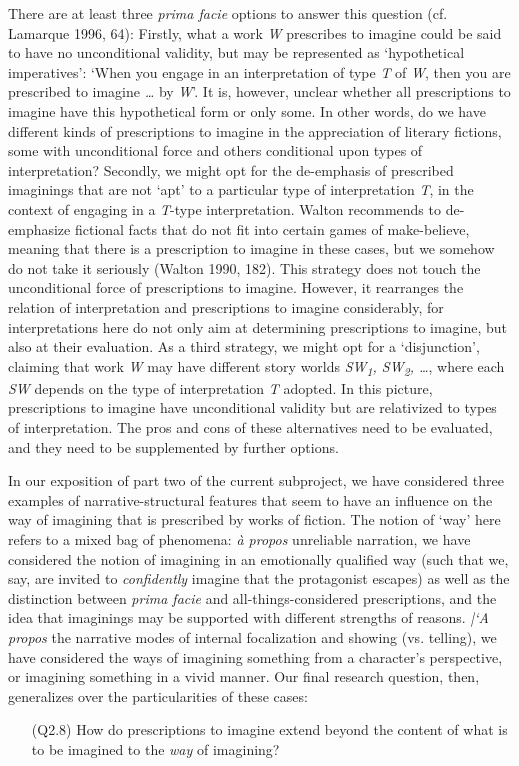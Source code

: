 \noindent There are at least three \emph{prima facie} options to answer this question (cf. Lamarque 1996, 64): Firstly, what a work \emph{W} prescribes to imagine could be said to have no unconditional validity, but may be represented as `hypothetical imperatives': `When you engage in an interpretation of type \emph{T} of \emph{W}, then you are prescribed to imagine \emph{\ldots} by \emph{W}'. It is, however, unclear whether all prescriptions to imagine have this hypothetical form or only some. In other words, do we have different kinds of prescriptions to imagine in the appreciation of literary fictions, some with unconditional force and others conditional upon types of interpretation? Secondly, we might opt for the de-emphasis of prescribed imaginings that are not `apt' to a particular type of interpretation \emph{T}, in the context of engaging in a \emph{T}-type interpretation. Walton recommends to de-emphasize fictional facts that do not fit into certain games of make-believe, meaning that there is a prescription to imagine in these cases, but we somehow do not take it seriously (Walton 1990, 182). This strategy does not touch the unconditional force of prescriptions to imagine. However, it rearranges the relation of interpretation and prescriptions to imagine considerably, for interpretations here do not only aim at determining prescriptions to imagine, but also at their evaluation. As a third strategy, we might opt for a `disjunction', claiming that work \emph{W} may have different story worlds \emph{SW\textsubscript{1}, SW\textsubscript{2}, \ldots}, where each \emph{SW} depends on the type of interpretation \emph{T} adopted. In this picture, prescriptions to imagine have unconditional validity but are relativized to types of interpretation. The pros and cons of these alternatives need to be evaluated, and they need to be supplemented by further options. 

In our exposition of part two of the current subproject, we have considered three examples of narrative-structural features that seem to have an influence on the way of imagining that is prescribed by works of fiction. The notion of `way' here refers to a mixed bag of phenomena: \emph{\`a propos} unreliable narration, we have considered the notion of imagining in an emotionally qualified way (such that we, say, are invited to \emph{confidently} imagine that the protagonist escapes) as well as the distinction between \emph{prima facie} and all-things-considered prescriptions, and the idea that imaginings may be supported with different strengths of reasons. \emph{|`A propos} the narrative modes of internal focalization and showing (vs. telling), we have considered the ways of imagining something from a character's perspective, or imagining something in a vivid manner. Our final research question, then, generalizes over the particularities of these cases:

\vspace{-.1cm}
\begin{itemize}[leftmargin=2cm]
\item[(Q2.8)] How do prescriptions to imagine extend beyond the content of what is to be imagined to the  \emph{way} of imagining?
\end{itemize}
\vspace{-.1cm}


